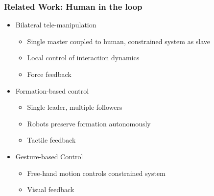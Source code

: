 \documentclass[student]{ITRslides}
\begin{document}
\begin{frame}
	\frametitle{Related Work: Human in the loop}
	\begin{itemize}
		\item Bilateral tele-manipulation  \cite{Lee_05}
		\begin{itemize}
			\item Single master coupled to human, constrained system as slave
			\item Local control of interaction dynamics
			\item Force feedback
		\end{itemize}
		\item Formation-based control \cite{Sieber_15, Scheggi_14}
		\begin{itemize}
			\item Single leader, multiple followers
			\item Robots preserve formation autonomously
			\item Tactile feedback
		\end{itemize}
		\item Gesture-based Control \cite{Gioioso_2014}
		\begin{itemize}
			\item Free-hand motion controls constrained system
			\item Visual feedback
		\end{itemize}
		\end{itemize}
\end{frame}
\end{document}
